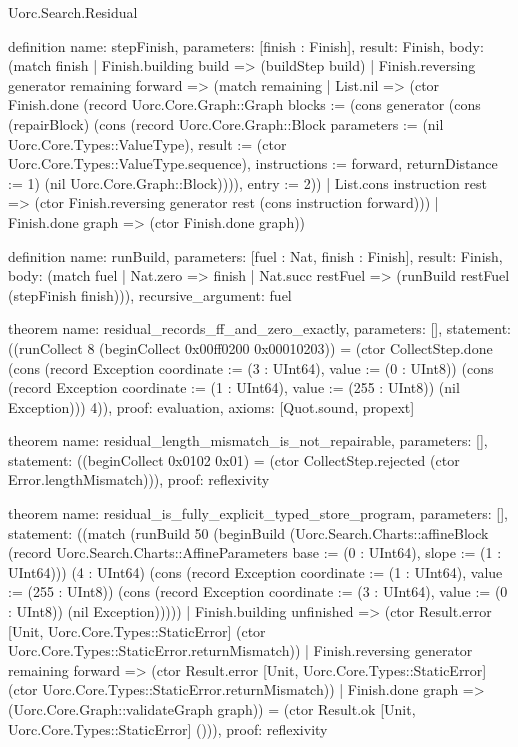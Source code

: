 \begin{lexlean}{Uorc.Search.Residual}
\begin{semanticmodule}
definition{
  name: stepFinish,
  parameters: [finish : Finish],
  result: Finish,
  body: (match finish
    | Finish.building build => (buildStep build)
    | Finish.reversing generator remaining forward => (match remaining
      | List.nil => (ctor Finish.done (record Uorc.Core.Graph::Graph {blocks := (cons generator (cons (repairBlock) (cons (record Uorc.Core.Graph::Block {parameters := (nil Uorc.Core.Types::ValueType), result := (ctor Uorc.Core.Types::ValueType.sequence), instructions := forward, returnDistance := 1}) (nil Uorc.Core.Graph::Block)))), entry := 2}))
      | List.cons instruction rest => (ctor Finish.reversing generator rest (cons instruction forward)))
    | Finish.done graph => (ctor Finish.done graph))
}

definition{
  name: runBuild,
  parameters: [fuel : Nat, finish : Finish],
  result: Finish,
  body: (match fuel
    | Nat.zero => finish
    | Nat.succ restFuel => (runBuild restFuel (stepFinish finish))),
  recursive_argument: fuel
}

theorem{
  name: residual_records_ff_and_zero_exactly,
  parameters: [],
  statement: ((runCollect 8 (beginCollect 0x00ff0200 0x00010203)) = (ctor CollectStep.done (cons (record Exception {coordinate := (3 : UInt64), value := (0 : UInt8)}) (cons (record Exception {coordinate := (1 : UInt64), value := (255 : UInt8)}) (nil Exception))) 4)),
  proof: evaluation{},
  axioms: [Quot.sound, propext]
}

theorem{
  name: residual_length_mismatch_is_not_repairable,
  parameters: [],
  statement: ((beginCollect 0x0102 0x01) = (ctor CollectStep.rejected (ctor Error.lengthMismatch))),
  proof: reflexivity{}
}

theorem{
  name: residual_is_fully_explicit_typed_store_program,
  parameters: [],
  statement: ((match (runBuild 50 (beginBuild (Uorc.Search.Charts::affineBlock (record Uorc.Search.Charts::AffineParameters {base := (0 : UInt64), slope := (1 : UInt64)})) (4 : UInt64) (cons (record Exception {coordinate := (1 : UInt64), value := (255 : UInt8)}) (cons (record Exception {coordinate := (3 : UInt64), value := (0 : UInt8)}) (nil Exception)))))
    | Finish.building unfinished => (ctor Result.error [Unit, Uorc.Core.Types::StaticError] (ctor Uorc.Core.Types::StaticError.returnMismatch))
    | Finish.reversing generator remaining forward => (ctor Result.error [Unit, Uorc.Core.Types::StaticError] (ctor Uorc.Core.Types::StaticError.returnMismatch))
    | Finish.done graph => (Uorc.Core.Graph::validateGraph graph)) = (ctor Result.ok [Unit, Uorc.Core.Types::StaticError] ())),
  proof: reflexivity{}
}
\end{semanticmodule}
\end{lexlean}
